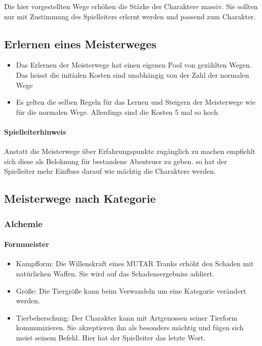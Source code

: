 \documentclass{article}
\begin{document}
Die hier vorgestellten Wege erhöhen die Stärke der Charaktere massiv. Sie sollten nur mit Zustimmung des Spielleiters
erlernt werden und passend zum Charakter.

\begin{center}
\subsection{Erlernen eines Meisterweges}
\end{center}

\begin{itemize}
\item Das Erlernen der Meisterwege hat einen eigenen Pool von gezählten Wegen. Das heisst die initialen Kosten sind unabhängig von der Zahl der normalen Wege
\item Es gelten die selben Regeln für das Lernen und Steigern der Meisterwege wie für die normalen Wege. Allerdings sind die Kosten 5 mal so hoch
\end{itemize}

\begin{mdframed}[hidealllines=true, backgroundcolor=black!10]
\paragraph{Spielleiterhinweis}

Anstatt die Meisterwege über Erfahrungspunkte zugänglich zu machen empfiehlt sich diese als Belohnung für bestandene
Abenteuer zu geben. so hat der Spielleiter mehr Einfluss darauf wie mächtig die Charaktere werden.

\end{mdframed}
\begin{center}
\subsection{Meisterwege nach Kategorie}
\end{center}

\subsubsection{Alchemie}

\paragraph{Formmeister}

\begin{itemize}
\item Kampfform: Die Willenskraft eines MUTAR Tranks erhöht den Schaden mit natürlichen Waffen. Sie wird auf das Schadensergebniss addiert.
\item Größe: Die Tiergröße kann beim Verwandeln um eine Kategorie verändert werden.
\item Tierbeherschung: Der Charakter kann mit Artgenossen seiner Tierform kommunizieren. Sie akzeptieren ihn als besonders mächtig und fügen sich meist seinem Befehl. Hier hat der Spielleiter das letzte Wort.
\end{itemize}
\end{document}

